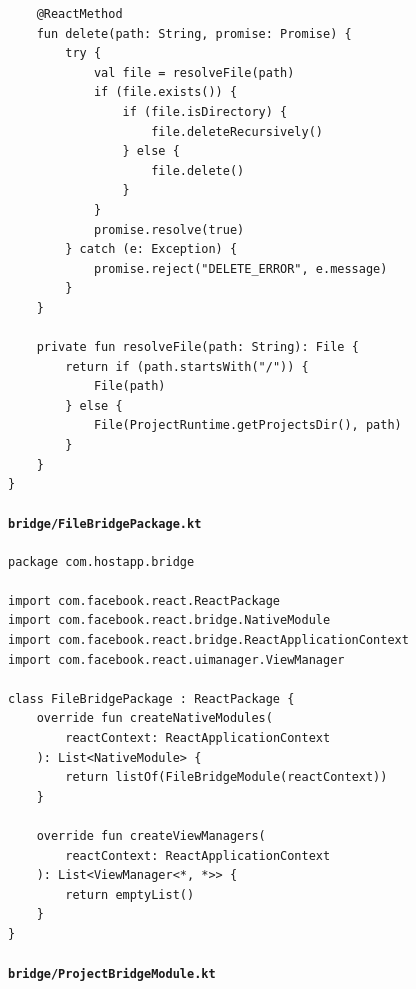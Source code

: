\documentclass[11pt]{article}
\begin{document}
\begin{verbatim}
    @ReactMethod
    fun delete(path: String, promise: Promise) {
        try {
            val file = resolveFile(path)
            if (file.exists()) {
                if (file.isDirectory) {
                    file.deleteRecursively()
                } else {
                    file.delete()
                }
            }
            promise.resolve(true)
        } catch (e: Exception) {
            promise.reject("DELETE_ERROR", e.message)
        }
    }

    private fun resolveFile(path: String): File {
        return if (path.startsWith("/")) {
            File(path)
        } else {
            File(ProjectRuntime.getProjectsDir(), path)
        }
    }
}
\end{verbatim}

\paragraph{\texttt{bridge/FileBridgePackage.kt}}

\begin{verbatim}
package com.hostapp.bridge

import com.facebook.react.ReactPackage
import com.facebook.react.bridge.NativeModule
import com.facebook.react.bridge.ReactApplicationContext
import com.facebook.react.uimanager.ViewManager

class FileBridgePackage : ReactPackage {
    override fun createNativeModules(
        reactContext: ReactApplicationContext
    ): List<NativeModule> {
        return listOf(FileBridgeModule(reactContext))
    }

    override fun createViewManagers(
        reactContext: ReactApplicationContext
    ): List<ViewManager<*, *>> {
        return emptyList()
    }
}
\end{verbatim}

\paragraph{\texttt{bridge/ProjectBridgeModule.kt}}
\end{document}
